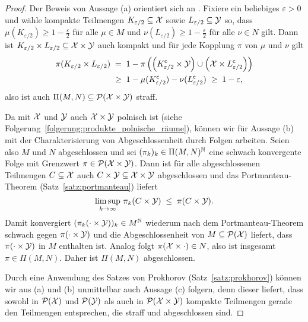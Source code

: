 \documentclass[../thesis/thesis.tex]{subfiles}
\begin{document}
	\begin{proof}
		Der Beweis von Aussage (a) orientiert sich an \cite[Lemma 4.4]{Villani.2009}. Fixiere ein beliebiges $\varepsilon > 0 $ und wähle kompakte Teilmengen $K_{\varepsilon/2} \subseteq \mathcal{X}$ sowie $L_{\varepsilon/2} \subseteq \mathcal{Y}$ so, dass $\mu(K_{\varepsilon/2}) \geq 1 - \frac{\varepsilon}{2}$ 
		für alle $\mu \in M$ und $\nu(L_{\varepsilon/2}) \geq 1 - \frac{\varepsilon}{2}$ für alle $\nu \in N$ gilt. Dann ist $K_{\varepsilon/2} \times L_{\varepsilon/2} \subseteq \mathcal{X} \times \mathcal{Y}$ auch kompakt und für jede Kopplung $\pi$ von $\mu$ und $\nu$ gilt
		\begin{align*}
			\pi(K_{\varepsilon/2} \times L_{\varepsilon/2}) \; &= \; 1 - \pi \left( \left(K_{\varepsilon/2}^\mathsf{c} \times \mathcal{Y} \right) \cup \left(\mathcal{X} \times L_{\varepsilon/2}^\mathsf{c} \right)\right) \\
			&\geq \; 1 - \mu(K_{\varepsilon/2}^\mathsf{c}) - \nu(L_{\varepsilon/2}^\mathsf{c}) \; \geq \; 1 - \varepsilon \text{,}
		\end{align*}
		also ist auch $\Pi(M, N) \subseteq \mathcal{P}(\mathcal{X} \times \mathcal{Y})$ straff.
		
		Da mit $\mathcal{X}$ und $\mathcal{Y}$ auch $\mathcal{X} \times \mathcal{Y}$ polnisch ist (siehe Folgerung~\ref{folgerung:produkte_polnische_räume}), können wir für Aussage (b) mit der Charakterisierung von Abgeschlossenheit durch Folgen arbeiten.
		Seien also $M$ und $N$ abgeschlossen und sei $(\pi_k)_k \in \Pi(M, N)^{\mathbb{N}}$ eine schwach konvergente Folge mit Grenzwert $\pi \in \mathcal{P}(\mathcal{X} \times \mathcal{Y})$.
		Dann ist für alle abgeschlossenen Teilmengen $C \subseteq \mathcal{X}$ auch $C \times \mathcal{Y} \subseteq \mathcal{X} \times \mathcal{Y}$ abgeschlossen und das Portmanteau-Theorem (Satz~\ref{satz:portmanteau}) liefert
		\[ \limsup_{k \to \infty} \, \pi_k(C \times \mathcal{Y}) \; \leq \; \pi(C \times \mathcal{Y}) \text{.} \]
		Damit konvergiert $(\pi_k(\cdot \times \mathcal{Y}))_k \in M^{\mathbb{N}}$ wiederum nach dem Portmanteau-Theorem schwach gegen $\pi(\cdot \times \mathcal{Y})$ und die Abgeschlossenheit 
		von $M \subseteq \mathcal{P}(\mathcal{X})$ liefert, dass $\pi(\cdot \times \mathcal{Y})$ in $M$
		enthalten ist. Analog folgt $\pi(\mathcal{X} \times \cdot) \in N$, also ist insgesamt $\pi \in \Pi(M, N)$. Daher ist $\Pi(M, N)$ abgeschlossen.
		
		Durch eine Anwendung des Satzes von Prokhorov (Satz~\ref{satz:prokhorov}) können wir aus (a) und (b) unmittelbar auch Aussage (c) folgern, denn dieser liefert, dass sowohl in $\mathcal{P}(\mathcal{X})$ und $\mathcal{P}(\mathcal{Y})$ als auch in $\mathcal{P}(\mathcal{X} \times \mathcal{Y})$ kompakte Teilmengen gerade den Teilmengen entsprechen, die straff und abgeschlossen sind.
	\end{proof}
\end{document}
